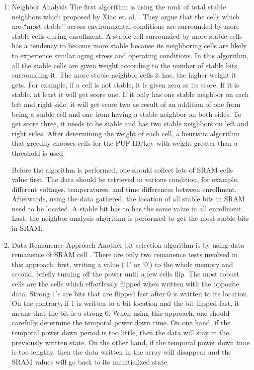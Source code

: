 \begin{enumerate}
  \item Neighbor Analysis\newline
The first algorithm is using the rank of total stable neighbors which proposed by Xiao et. al. \cite{xiao_rahman_forte_huang_su_tehranipoor_2014}. They argue that the cells which are “most stable” across environmental conditions are surrounded by more stable cells during enrollment. A stable cell surrounded by more stable cells has a tendency to become more stable because its neighboring cells are likely to experience similar aging stress and operating conditions.
In this algorithm, all the stable cells are given weight according to the number of stable bits surrounding it.
The more stable neighbor cells it has, the higher weight it gets. For example, if a cell is not stable, it is given zero as its score. If it is stable, at least it will get score one. If it only has one stable neighbor on each left and right side, it will get score two as result of an addition of one from being a stable cell and one from having a stable neighbor on both sides. To get score three, it needs to be stable and has two stable neighbors on left and right sides.
After determining the weight of each cell, a heuristic algorithm that greedily chooses cells for the PUF ID/key with weight greater than a threshold is used.

Before the algorithm is performed, one should collect lots of SRAM cells value first. The data should be retrieved in various condition, for example, different voltages, temperatures, and time differences between enrollment.
Afterwards, using the data gathered, the location of all stable bits in SRAM need to be located. A stable bit has to has the same value in all enrollment.
Last, the neighbor analysis algorithm is performed to get the most stable bits in SRAM.

\item Data Remanence Approach\newline
Another bit selection algorithm is by using data remanence of SRAM cell \cite{liu_zhou_tang_parhi_kim_2017}.
There are only two remanence tests involved in this approach: first, writing a value (‘1’ or ‘0’) to the whole memory and second, briefly turning off the power until a few cells flip. The most robust cells are the cells which effortlessly flipped when written with the opposite data. Strong 1's are bits that are flipped fast after 0 is written to its location. On the contrary, if 1 is written to a bit location and the bit flipped fast, it means that the bit is a strong 0.
When using this approach, one should carefully determine the temporal power down time. On one hand, if the temporal power down period is too little, then the data will stay in the previously written state. On the other hand, if the temporal power down time is too lengthy, then the data written in the array will disappear and the SRAM values will go back to its uninitialized state.


\end{enumerate}
